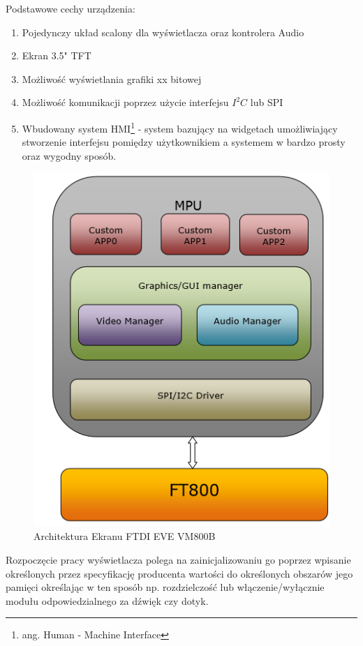 \documentclass{xmgr}
\begin{document}
Podstawowe cechy urządzenia\cite{FTDI}:
\begin{enumerate}
	\item Pojedynczy układ scalony dla wyświetlacza oraz kontrolera Audio
	\item Ekran 3.5" TFT
	\item Możliwość wyświetlania grafiki xx bitowej
	\item Możliwość komunikacji poprzez użycie interfejsu $I^2C$ lub SPI
	\item Wbudowany system HMI\footnote{ang. Human - Machine Interface} - system bazujący na widgetach umożliwiający stworzenie interfejsu pomiędzy użytkownikiem a systemem w bardzo prosty oraz wygodny sposób.
\end{enumerate}

\begin{figure}[!h]
    \centering
    \includegraphics[height=0.3\textheight]{images/FTDIarchitecture.png}
    \caption{Architektura Ekranu FTDI EVE VM800B}
\end{figure}

Rozpoczęcie pracy wyświetlacza polega na zainicjalizowaniu go poprzez wpisanie określonych przez specyfikację producenta wartości do określonych obszarów jego pamięci określając w ten sposób np. rozdzielczość lub włączenie/wyłącznie modułu odpowiedzialnego za dźwięk czy dotyk. 
\end{document}
